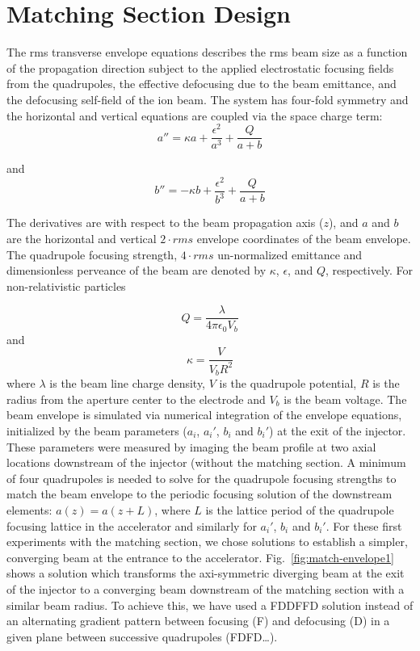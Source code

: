 \documentclass[%
 aip,
rsi,%
 amsmath,amssymb,
 reprint,%
]{revtex4-1}
\begin{document}
\section{Matching Section Design}
The rms transverse envelope equations describes the rms beam size as a function of the propagation direction subject to the applied electrostatic focusing fields from the quadrupoles, the effective defocusing due to the beam emittance, and the defocusing self-field of the ion beam.  The system has four-fold symmetry and the horizontal and vertical equations are coupled via the space charge term:
\begin{equation}
a'' = \kappa a + \frac{\epsilon^2}{a^3}+\frac{Q}{a+b}
\end{equation}

and 
\begin{equation}
b'' = -\kappa b + \frac{\epsilon^2}{b^3}+\frac{Q}{a+b}
\end{equation}

The derivatives are with respect to the beam propagation axis ($z$), and $a$ and $b$ are the horizontal and vertical $2 \cdot rms$ envelope coordinates of the beam envelope. The quadrupole focusing strength, $4 \cdot rms$ un-normalized emittance and dimensionless perveance of the beam are denoted by $\kappa$, $\epsilon$, and $Q$, respectively.  For non-relativistic particles

\begin{equation} 
Q = \frac{\lambda}{4 \pi \epsilon_0 V_{b}} 
\end{equation}
and 
\begin{equation}
\kappa = \frac{V}{V_{b}R^2}
\end{equation}
where $\lambda$ is the beam line charge density, $V$ is the quadrupole potential, $R$ is the radius from the aperture center to the electrode and $V_{b}$ is the beam voltage.
The beam envelope is simulated via numerical integration of the envelope equations, initialized by the beam parameters ($a_i$, $a_i'$, $b_i$ and $b_i'$) at the exit of the injector.  These parameters were measured by imaging the beam profile at two axial locations downstream of the injector (without the matching section. A minimum of four quadrupoles is needed to solve for the quadrupole focusing strengths to match the beam envelope to the periodic focusing solution of the downstream elements: $a(z) = a(z+L)$, where $L$ is the lattice period of the quadrupole focusing lattice in the accelerator and similarly for $a_i'$, $b_i$ and $b_i'$.  For these first experiments with the matching section, we chose solutions to establish a simpler, converging beam at the entrance to the accelerator.  Fig.~\ref{fig:match-envelope1} shows a solution which transforms the axi-symmetric diverging beam at the exit of the injector to a converging beam downstream of the matching section with a similar beam radius.  To achieve this, we have used a FDDFFD solution instead of an alternating gradient pattern between focusing (F) and defocusing (D) in a given plane between successive quadrupoles (FDFD\ldots). 
\end{document}

